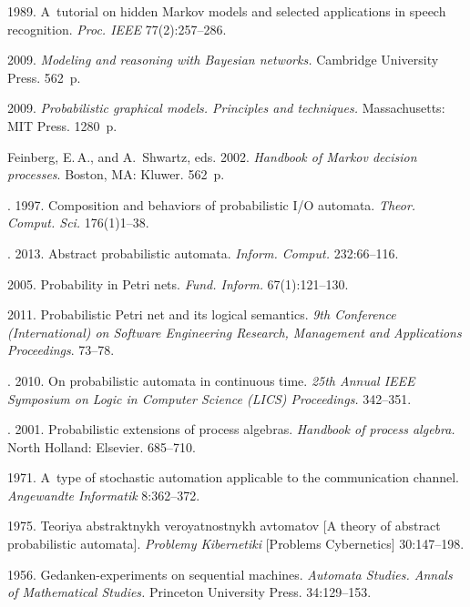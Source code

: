 \begin{multicols}{2}
{{\begin{thebibliography}{99}
1989. A~tutorial on hidden Markov models and selected applications in
speech recognition. \textit{Proc. IEEE}
77(2):257--286.

2009. \textit{Modeling and reasoning with Bayesian networks.}
Cambridge University Press. 562~p.

2009. \textit{Probabilistic graphical models. Principles and techniques.}
Massachusetts: MIT Press. 1280~p.

Feinberg, E.\,A., and A.~Shwartz, eds.
2002. \textit{Handbook of Markov decision processes}.
Boston, MA: Kluwer. 562~p.

.
1997. Composition and behaviors of probabilistic I/O automata.
\textit{Theor. Comput. Sci.} 176(1)1--38.

.
2013. Abstract probabilistic  automata.
\textit{Inform. Comput.} 232:66--116.

2005. Probability in Petri nets.
\textit{Fund. Inform.} 67(1):121--130.

2011. Probabilistic Petri net and its logical semantics.
\textit{9th  Conference (International) on Software Engineering Research,
Management and Applications Proceedings}. 73--78.

.
2010. On probabilistic automata in continuous time.
\textit{25th Annual IEEE Symposium on Logic
in Computer Science (LICS) Proceedings.} 342--351.

.
2001. Probabilistic  extensions of process algebras.
\textit{Handbook of process algebra.}
North Holland: Elsevier. 685--710.

1971. A~type of stochastic automation applicable to the communication channel.
\textit{Angewandte Informatik} 8:362--372.

1975. Teoriya abstraktnykh veroyatnostnykh avtomatov
[A theory of abstract probabilistic automata].
\textit{Problemy Kibernetiki}
[Problems Cybernetics]  30:147--198.

1956. Gedanken-experiments on sequential machines.
\textit{Automata Studies. Annals of Mathematical Studies.}
Princeton University Press.
34:129--153.


\end{thebibliography}}}
\end{multicols}
